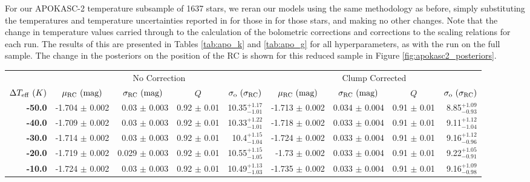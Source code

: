 \documentclass[fleqn,usenatbib]{mnras}
\newcommand{\new}[1]{#1}
\begin{document}
\new{For our APOKASC-2 temperature subsample of 1637 stars, we reran our models using the same methodology as before,} simply substituting the temperatures and temperature uncertainties reported in \cite{art:pinsonneault+2018} for those in  for those stars, and making no other changes. Note that the change in temperature values carried through to the calculation of the bolometric corrections and corrections to the scaling relations for each run. The results of this are presented in Tables \ref{tab:apo_k} and \ref{tab:apo_g} for all hyperparameters, as with the run on the full sample. The change in the posteriors on the position of the RC is shown for this reduced sample in Figure \ref{fig:apokasc2_posteriors}.


\begin{table}
    \begin{tabular}{rrrrr|rrrr}
    \toprule
    {} & \multicolumn{4}{|c|}{No Correction} & \multicolumn{4}{|c|}{Clump Corrected} \\
    \cmidrule(lr){2-5}\cmidrule(lr){6-9}
    \multicolumn{1}{c}{$\Delta T_{\rm eff}\ (K)$} & \multicolumn{1}{c}{$\mu_{\rm RC}\ (\rm mag)$} & \multicolumn{1}{c}{$\sigma_{\rm RC}\ (\rm mag)$}  & \multicolumn{1}{c}{$Q$} &  \multicolumn{1}{c}{$\sigma_{\rm o}\ (\sigma_{\rm RC})$} & \multicolumn{1}{c}{$\mu_{\rm RC}\ (\rm mag)$} & \multicolumn{1}{c}{$\sigma_{\rm RC}\ (\rm mag)$}  & \multicolumn{1}{c}{$Q$} &  \multicolumn{1}{c}{$\sigma_{\rm o}\ (\sigma_{\rm RC})$} \\
    \midrule
        \textbf{-50.0} & -1.704 $\pm$ 0.002 &   0.03 $\pm$ 0.003 &  0.92 $\pm$ 0.01 &  10.35$_{-1.01}^{+1.17}$    & -1.713 $\pm$ 0.002 &   0.034 $\pm$ 0.004 &  0.91 $\pm$ 0.01 &   8.85$_{-0.93}^{+1.09}$\\
        \textbf{-40.0} & -1.709 $\pm$ 0.002 &   0.03 $\pm$ 0.003 &  0.92 $\pm$ 0.01 &  10.33$_{-1.01}^{+1.22}$    & -1.718 $\pm$ 0.002 &   0.033 $\pm$ 0.004 &  0.91 $\pm$ 0.01 &   9.11$_{-1.04}^{+1.12}$ \\
        \textbf{-30.0} & -1.714 $\pm$ 0.002 &   0.03 $\pm$ 0.003 &  0.92 $\pm$ 0.01 &   10.4$_{-1.04}^{+1.15}$    & -1.724 $\pm$ 0.002 &   0.033 $\pm$ 0.004 &  0.91 $\pm$ 0.01 &   9.16$_{-0.96}^{+1.12}$\\
        \textbf{-20.0} & -1.719 $\pm$ 0.002 &  0.029 $\pm$ 0.003 &  0.92 $\pm$ 0.01 &  10.55$_{-1.05}^{+1.15}$    &  -1.73 $\pm$ 0.002 &   0.033 $\pm$ 0.004 &  0.91 $\pm$ 0.01 &   9.22$_{-0.91}^{+1.05}$ \\
        \textbf{-10.0} & -1.724 $\pm$ 0.002 &   0.03 $\pm$ 0.003 &  0.92 $\pm$ 0.01 &  10.49$_{-1.03}^{+1.13}$    & -1.735 $\pm$ 0.002 &   0.033 $\pm$ 0.004 &  0.91 $\pm$ 0.01 &   9.16$_{-0.98}^{+1.09}$\\

\end{tabular}
\end{table}
\end{document}
